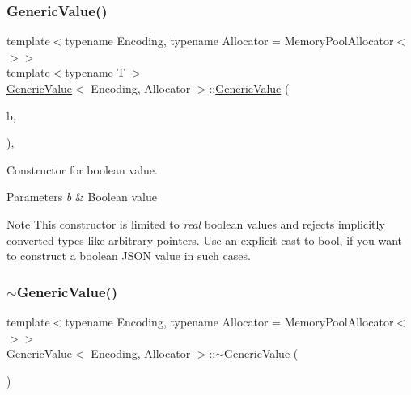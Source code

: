 \subsubsection{\texorpdfstring{Generic\+Value()}{GenericValue()}\hspace{0.1cm}{\footnotesize\ttfamily [3/8]}}
{\footnotesize\ttfamily template$<$typename Encoding, typename Allocator = Memory\+Pool\+Allocator$<$$>$$>$ \\
template$<$typename T $>$ \\
\hyperlink{classGenericValue}{Generic\+Value}$<$ Encoding, Allocator $>$\+::\hyperlink{classGenericValue}{Generic\+Value} (\begin{DoxyParamCaption}\item[{T}]{b,  }\item[{R\+A\+P\+I\+D\+J\+S\+O\+N\+\_\+\+E\+N\+A\+B\+L\+E\+IF((internal\+::\+Is\+Same$<$ T, bool $>$))}]{ }\end{DoxyParamCaption})\hspace{0.3cm}{\ttfamily [inline]}, {\ttfamily [explicit]}}



Constructor for boolean value. 


\begin{DoxyParams}{Parameters}
{\em b} & Boolean value \\
\hline
\end{DoxyParams}
\begin{DoxyNote}{Note}
This constructor is limited to {\itshape real} boolean values and rejects implicitly converted types like arbitrary pointers. Use an explicit cast to {\ttfamily bool}, if you want to construct a boolean J\+S\+ON value in such cases. 
\end{DoxyNote}
\mbox{\label{classGenericValue_a213ba89ef5ef961a5e655bd8c78ac9f4}} 
\subsubsection{\texorpdfstring{$\sim$\+Generic\+Value()}{~GenericValue()}\hspace{0.1cm}{\footnotesize\ttfamily [1/2]}}
{\footnotesize\ttfamily template$<$typename Encoding, typename Allocator = Memory\+Pool\+Allocator$<$$>$$>$ \\
\hyperlink{classGenericValue}{Generic\+Value}$<$ Encoding, Allocator $>$\+::$\sim$\hyperlink{classGenericValue}{Generic\+Value} (\begin{DoxyParamCaption}{ }\end{DoxyParamCaption})\hspace{0.3cm}{\ttfamily [inline]}}



